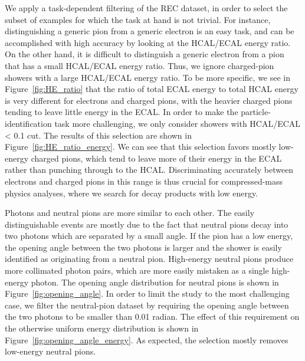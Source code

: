 We apply a task-dependent filtering of the REC dataset, in order to select the subset of examples for which the task at hand is not trivial. For instance, distinguishing a generic pion from a generic electron is an easy task, and can be accomplished with high accuracy by looking at the HCAL/ECAL energy ratio. On the other hand, it is difficult to distinguish a generic electron from a pion that has a small HCAL/ECAL energy ratio. Thus, we ignore charged-pion showers with a large HCAL/ECAL energy ratio. To be more specific, we see in Figure~\ref{fig:HE_ratio} that the ratio of total ECAL energy to total HCAL energy is very different for electrons and charged pions, with the heavier charged pions tending to leave little energy in the ECAL. In order to make the particle-identification task more challenging, we only consider showers with HCAL/ECAL < 0.1 cut. The results of this selection are shown in Figure~\ref{fig:HE_ratio_energy}. We can see that this selection favors mostly low-energy charged pions, which tend to leave more of their energy in the ECAL rather than punching through to the HCAL. Discriminating accurately between electrons and charged pions in this range is thus crucial for compressed-mass physics analyses, where we search for decay products with low energy.

Photons and neutral pions are more similar to each other. The easily distinguishable events are mostly due to the fact that neutral pions decay into two photons which are separated by a small angle. If the pion has a low energy, the opening angle between the two photons is larger and the shower is easily identified as originating from a neutral pion. High-energy neutral pions produce more collimated photon pairs, which are more easily mistaken as a single high-energy photon. The opening angle distribution for neutral pions is shown in Figure~\ref{fig:opening_angle}. In order to limit the study to the most challenging case, we filter the neutral-pion dataset by requiring the opening angle between the two photons to be smaller than 0.01 radian.  The effect of  this requirement on the otherwise uniform energy distribution is shown in Figure~\ref{fig:opening_angle_energy}. As expected, the selection mostly removes low-energy neutral pions. 


